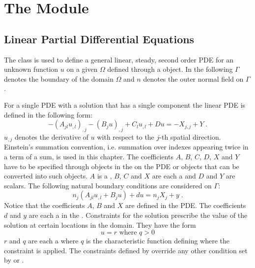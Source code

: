 
%
%
%


\chapter{The \linearPDEs Module}

\section{Linear Partial Differential Equations}
\label{SEC LinearPDE}

The \LinearPDE class is used to define a general linear, steady, second order
PDE for an unknown function $u$ on a given $\Omega$ defined through a \Domain object.
In the following $\Gamma$ denotes the boundary of the domain $\Omega$ and $n$
denotes the outer normal field on $\Gamma$.

For a single PDE with a solution that has a single component the linear PDE is
defined in the following form:
\begin{equation}\label{LINEARPDE.SINGLE.1}
-(A_{jl} u_{,l})_{,j}-(B_{j} u)_{,j}+C_{l} u_{,l}+D u =-X_{j,j}+Y \; .
\end{equation}
$u_{,j}$ denotes the derivative of $u$ with respect to the $j$-th spatial direction.
Einstein's summation convention, i.e. summation over indexes appearing twice
in a term of a sum, is used in this chapter.
The coefficients $A$, $B$, $C$, $D$, $X$ and $Y$ have to be specified through
\Data objects in the \Function on the PDE or objects that can be converted
into such \Data objects.
$A$ is a \RankTwo, $B$, $C$ and $X$ are each a \RankOne and $D$ and $Y$ are
scalars.
The following natural boundary conditions are considered on $\Gamma$:
\begin{equation}\label{LINEARPDE.SINGLE.2}
n_{j}(A_{jl} u_{,l}+B_{j} u)+d u=n_{j}X_{j} + y  \;.
\end{equation}
Notice that the coefficients $A$, $B$ and $X$ are defined in the PDE.
The coefficients $d$ and $y$ are each a \Scalar in the \FunctionOnBoundary.
Constraints for the solution prescribe the value of the
solution at certain locations in the domain. They have the form
\begin{equation}\label{LINEARPDE.SINGLE.3}
u=r \mbox{ where } q>0
\end{equation}
$r$ and $q$ are each a \Scalar where $q$ is the characteristic function
defining where the constraint is applied.
The constraints defined by  override any other
condition set by  or .


